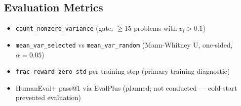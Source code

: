 \subsection{Evaluation Metrics}

\begin{itemize}
\item \texttt{count\_nonzero\_variance} (gate: $\geq$15 problems with $v_i > 0.1$)
\item \texttt{mean\_var\_selected} vs \texttt{mean\_var\_random} (Mann-Whitney U, one-sided, $\alpha=0.05$)
\item \texttt{frac\_reward\_zero\_std} per training step (primary training diagnostic)
\item HumanEval+ pass@1 via EvalPlus \citep{Liu2023EvalPlus} (planned; not conducted --- cold-start prevented evaluation)
\end{itemize}
